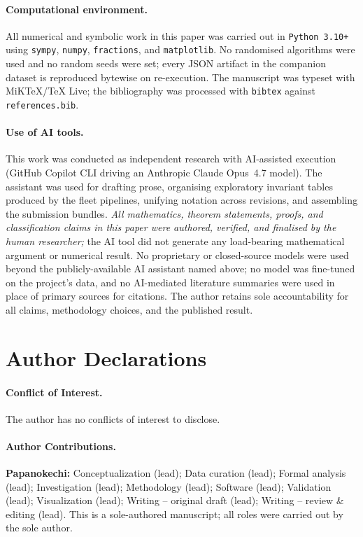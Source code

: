\documentclass[aip,jmp,preprint,amsmath,amssymb,nofootinbib,floatfix]{revtex4-2}
\theoremstyle{plain}
\theoremstyle{definition}
\theoremstyle{remark}
\begin{document}
\paragraph{Computational environment.}
All numerical and symbolic work in this paper was carried out in
\texttt{Python 3.10+} using \texttt{sympy}, \texttt{numpy},
\texttt{fractions}, and \texttt{matplotlib}. No randomised algorithms
were used and no random seeds were set; every JSON artifact in the
companion dataset \cite{wkb_dataset_v1} is reproduced bytewise on
re-execution. The manuscript was typeset with MiKTeX/\TeX{} Live; the
bibliography was processed with \texttt{bibtex} against
\texttt{references.bib}.

\paragraph{Use of AI tools.}
This work was conducted as independent research with AI-assisted
execution (GitHub Copilot CLI driving an Anthropic Claude Opus~4.7
model). The assistant was used for drafting prose, organising
exploratory invariant tables produced by the fleet pipelines, unifying
notation across revisions, and assembling the submission bundles.
\emph{All mathematics, theorem statements, proofs, and classification
claims in this paper were authored, verified, and finalised by the
human researcher;} the AI tool did not generate any load-bearing
mathematical argument or numerical result. No proprietary or
closed-source models were used beyond the publicly-available AI
assistant named above; no model was fine-tuned on the project's data,
and no AI-mediated literature summaries were used in place of primary
sources for citations. The author retains sole accountability for all
claims, methodology choices, and the published result.

\section*{Author Declarations}\label{sec:declarations}

\paragraph{Conflict of Interest.}
The author has no conflicts of interest to disclose.

\paragraph{Author Contributions.}
\textbf{Papanokechi:} Conceptualization (lead); Data curation (lead);
Formal analysis (lead); Investigation (lead); Methodology (lead);
Software (lead); Validation (lead); Visualization (lead);
Writing -- original draft (lead); Writing -- review \& editing (lead).
This is a sole-authored manuscript; all roles were carried out by the
sole author.
\end{document}
